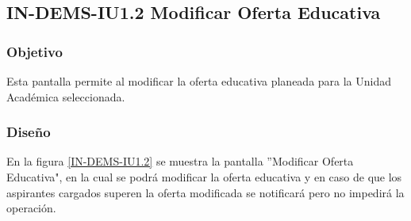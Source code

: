 \subsection{IN-DEMS-IU1.2 Modificar Oferta Educativa}

\subsubsection{Objetivo}

Esta pantalla permite al  modificar la oferta educativa planeada para la Unidad Académica seleccionada.

\subsubsection{Diseño}

En la figura \ref{IN-DEMS-IU1.2} se muestra la pantalla ''Modificar Oferta Educativa", en la cual se podrá modificar la oferta educativa y en caso de que los aspirantes cargados superen la oferta modificada se notificará pero no impedirá la operación.

